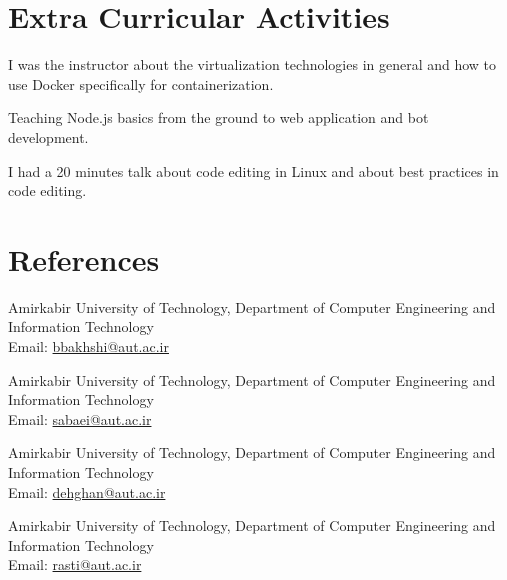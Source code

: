 \documentclass[]{deedy-resume-openfont}
\begin{document}
\begin{minipage}[t]{0.66\textwidth}
\section{Extra Curricular Activities}
I was the instructor about the virtualization technologies in general
and how to use Docker specifically for containerization.
\sectionsep

Teaching Node.js basics from the ground to web application and bot development.
\sectionsep

I had a 20 minutes talk about code editing in Linux and about
best practices in code editing.

\sectionsep


\section{References}
    Amirkabir University of Technology, Department of Computer Engineering and Information Technology \\
    Email: \href{mailto:bbakhshi@aut.ac.ir}{bbakhshi@aut.ac.ir}
\sectionsep

    Amirkabir University of Technology, Department of Computer Engineering and Information Technology \\
    Email: \href{mailto:sabaei@aut.ac.ir}{sabaei@aut.ac.ir}
\sectionsep

    Amirkabir University of Technology, Department of Computer Engineering and Information Technology \\
    Email: \href{mailto:dehghan@aut.ac.ir}{dehghan@aut.ac.ir}
\sectionsep

    Amirkabir University of Technology, Department of Computer Engineering and Information Technology \\
    Email: \href{mailto:rasti@aut.ac.ir}{rasti@aut.ac.ir}

% 
% 

\end{minipage}
\end{document}
